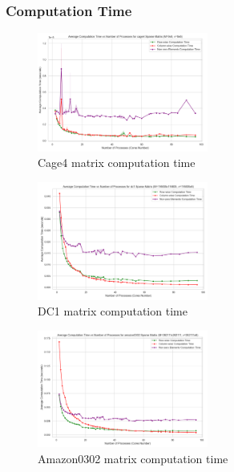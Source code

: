 \documentclass[12pt,oneside]{book} %
\begin{document}
\subsubsection{Computation Time}

\begin{figure}[H]
    \centering
    \includegraphics[width=0.5\textwidth]{../results/matrix_dim/cage4_k6_computation_time.png}
    \caption{Cage4 matrix computation time}\label{fig:cage4-k6-computation-time}
\end{figure}

\begin{figure}[H]
    \centering
    \includegraphics[width=0.5\textwidth]{../results/matrix_dim/dc1_k6_computation_time.png}
    \caption{DC1 matrix computation time}\label{fig:dc1-k6-computation-time}
\end{figure}

\begin{figure}[H]
    \centering
    \includegraphics[width=0.5\textwidth]{../results/matrix_dim/amazon0302_k6_computation_time.png}
    \caption{Amazon0302 matrix computation time}\label{fig:amazon0302-k6-computation-time}
\end{figure}
\end{document}
